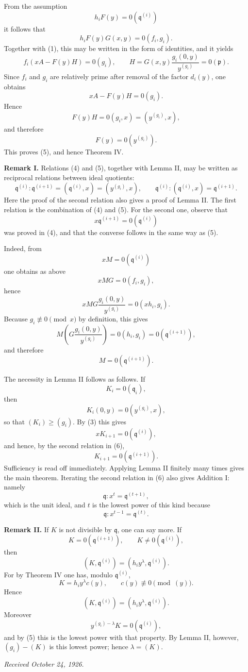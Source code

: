\documentclass[12pt]{article}
\begin{document}
From the assumption
\[
  h_iF(y)=0(\mathfrak q^{(i)})
\]
it follows that
\[
  h_iF(y)G(x,y)=0(f_i,g_i).
\]
Together with (1), this may be written in the form of identities, and it yields
\[
  f_i(xA-F(y)H)=0(g_i),
  \qquad
  H=G(x,y)\frac{g_i(0,y)}{y^{(g_i)}}=0(\mathfrak p).
\]
Since \(f_i\) and \(g_i\) are relatively prime after removal of the factor \(d_i(y)\), one obtains
\[
  xA-F(y)H=0(g_i).
\]
Hence
\[
  F(y)H=0(g_i,x)=(y^{(g_i)},x),
\]
and therefore
\[
  F(y)=0(y^{(g_i)}).
\]
This proves (5), and hence Theorem IV.

\textbf{Remark I.} Relations (4) and (5), together with Lemma II, may be written as reciprocal relations between ideal quotients:
\[
  \mathfrak q^{(i)}:\mathfrak q^{(i+1)}
  = (\mathfrak q^{(i)},x)
  = (y^{(g_i)},x),
  \qquad
  \mathfrak q^{(i)}:(\mathfrak q^{(i)},x)
  = \mathfrak q^{(i+1)}.
\tag{6}
\]
Here the proof of the second relation also gives a proof of Lemma II. The first relation is the combination of (4) and (5). For the second one, observe that
\[
  x\mathfrak q^{(i+1)}=0(\mathfrak q^{(i)})
\]
was proved in (4), and that the converse follows in the same way as (5).

Indeed, from
\[
  xM=0(\mathfrak q^{(i)})
\]
one obtains as above
\[
  xMG=0(f_i,g_i),
\]
hence
\[
  xMG\frac{g_i(0,y)}{y^{(g_i)}}=0(xh_i,g_i).
\]
Because \(g_i\not\equiv0\pmod{x}\) by definition, this gives
\[
  M\left(G\frac{g_i(0,y)}{y^{(g_i)}}\right)=0(h_i,g_i)=0(\mathfrak q^{(i+1)}),
\]
and therefore
\[
  M=0(\mathfrak q^{(i+1)}).
\]

The necessity in Lemma II follows as follows. If
\[
  K_i=0(\mathfrak q_i),
\]
then
\[
  K_i(0,y)=0(y^{(g_i)},x),
\]
so that \((K_i)\ge(g_i)\). By (3) this gives
\[
  xK_{i+1}=0(\mathfrak q^{(i)}),
\]
and hence, by the second relation in (6),
\[
  K_{i+1}=0(\mathfrak q^{(i+1)}).
\]
Sufficiency is read off immediately. Applying Lemma II finitely many times gives the main theorem. Iterating the second relation in (6) also gives Addition I: namely
\[
  \mathfrak q:x^t=\mathfrak q^{(t+1)},
\]
which is the unit ideal, and \(t\) is the lowest power of this kind because
\[
  \mathfrak q:x^{t-1}=\mathfrak q^{(t)}.
\]

\textbf{Remark II.} If \(K\) is not divisible by \(\mathfrak q\), one can say more. If
\[
  K=0(\mathfrak q^{(i+1)}),
  \qquad
  K\not=0(\mathfrak q^{(i)}),
\]
then
\[
  (K,\mathfrak q^{(i)})=(h_i y^{\lambda},\mathfrak q^{(i)}).
\]
For by Theorem IV one has, modulo \(\mathfrak q^{(i)}\),
\[
  K=h_i y^{\lambda}c(y),
  \qquad
  c(y)\not\equiv0\pmod{(y)}.
\]
Hence
\[
  (K,\mathfrak q^{(i)})=(h_i y^{\lambda},\mathfrak q^{(i)}).
\]
Moreover
\[
  y^{(g_i)-\lambda}K=0(\mathfrak q^{(i)}),
\]
and by (5) this is the lowest power with that property. By Lemma II, however, \((g_i)-(K)\) is this lowest power; hence \(\lambda=(K)\).

\textit{Received October 24, 1926.}
\end{document}

